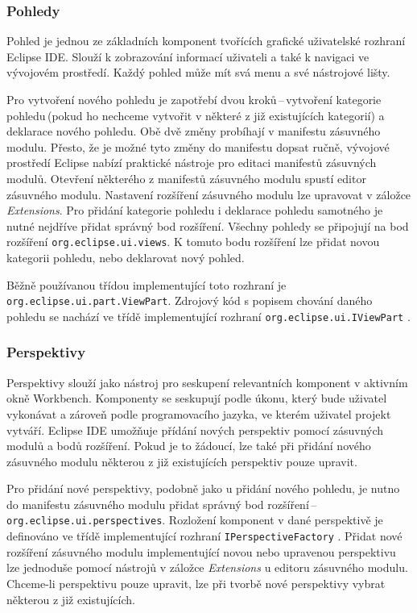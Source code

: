       \subsubsection{Pohledy}
      Pohled je jednou ze základních komponent tvořících grafické uživatelské rozhraní Eclipse IDE. Slouží k zobrazování informací uživateli a také k navigaci ve vývojovém prostředí. Každý pohled může mít svá menu a své nástrojové lišty.
      
      Pro vytvoření nového pohledu je zapotřebí dvou kroků\,--\,vytvoření kategorie pohledu\,(pokud ho nechceme vytvořit v některé z již existujících kategorií) a deklarace nového pohledu. Obě dvě změny probíhají v manifestu zásuvného modulu. Přesto, že je možné tyto změny do manifestu dopsat ručně, vývojové prostředí Eclipse nabízí praktické nástroje pro editaci manifestů zásuvných modulů. Otevření některého z manifestů zásuvného modulu spustí editor zásuvného modulu. Nastavení rozšíření zásuvného modulu lze upravovat v záložce \emph{Extensions}. Pro přidání kategorie pohledu i deklarace pohledu samotného je nutné nejdříve přidat správný bod rozšíření. Všechny pohledy se připojují na bod rozšíření \texttt{org.eclipse.ui.views}. K tomuto bodu rozšíření lze přidat novou kategorii pohledu, nebo deklarovat nový pohled.

      Běžně používanou třídou implementující toto rozhraní je \texttt{org.eclipse.ui.part.ViewPart}. Zdrojový kód s popisem chování daného pohledu se nachází ve třídě implementující rozhraní \texttt{org.eclipse.ui.IViewPart} \cite{Plugins}.

      \subsubsection{Perspektivy}
      Perspektivy slouží jako nástroj pro seskupení relevantních komponent v aktivním okně Workbench. Komponenty se seskupují podle úkonu, který bude uživatel vykonávat a  zároveň podle programovacího jazyka, ve kterém uživatel projekt vytváří. Eclipse IDE umožňuje přídání nových perspektiv pomocí zásuvných modulů a bodů rozšíření. Pokud je to žádoucí, lze také při přidání nového zásuvného modulu některou z již existujících perspektiv pouze upravit.

      Pro přidání nové perspektivy, podobně jako u přidání nového pohledu, je nutno do manifestu zásuvného modulu přidat správný bod rozšíření\,--\,\texttt{org.eclipse.ui.perspectives}. Rozložení komponent v dané perspektivě je definováno ve třídě implementující rozhraní \texttt{IPerspectiveFactory} \cite{Plugins}. Přidat nové rozšíření zásuvného modulu implementující novou nebo upravenou perspektivu lze jednoduše pomocí nástrojů v záložce \emph{Extensions} u editoru zásuvného modulu. Chceme-li perspektivu pouze upravit, lze při tvorbě nové perspektivy vybrat některou z již existujících.

